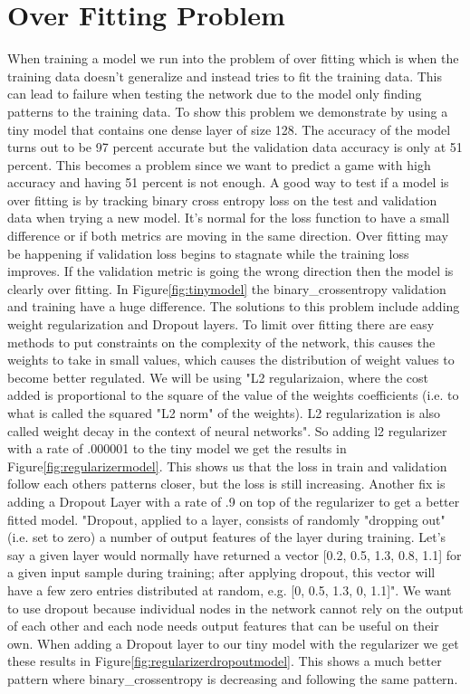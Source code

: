 \documentclass[12pt]{IEEEtran}
\begin{document}
\section{Over Fitting Problem}
When training a model we run into the problem of over fitting which is when the training data doesn't generalize and instead tries to fit the training data. This can lead to failure when testing the network due to the model only finding patterns to the training data. To show this problem we demonstrate by using a tiny model that contains one dense layer of size 128. The accuracy of the model turns out to be 97 percent accurate but the validation data accuracy is only at 51 percent. This becomes a problem since we want to predict a game with high accuracy and having 51 percent is not enough. A good way to test if a model is over fitting is by tracking binary cross entropy loss on the test and validation data when trying a new model. It's normal for the loss function to have a small difference or if both metrics are moving in the same direction. Over fitting may be happening if validation loss begins to stagnate while the training loss improves. If the validation metric is going the wrong direction then the model is clearly over fitting. In Figure\ref{fig:tinymodel} the binary\_crossentropy validation and training have a huge difference. The solutions to this problem include adding weight regularization and Dropout layers. To limit over fitting there are easy methods to put constraints on the complexity of the network, this causes the weights to take in small values, which causes the distribution of weight values to become better regulated. We will be using "L2 regularizaion, where the cost added is proportional to the square of the value of the weights coefficients (i.e. to what is called the squared "L2 norm" of the weights). L2 regularization is also called weight decay in the context of neural networks"\cite{tensorflow2015-whitepaper}. So adding l2 regularizer with a rate of .000001 to the tiny model we get the results in Figure\ref{fig:regularizermodel}. This shows us that the loss in train and validation follow each others patterns closer, but the loss is still increasing. Another fix is adding a Dropout Layer with a rate of .9 on top of the regularizer to get a better fitted model. "Dropout, applied to a layer, consists of randomly "dropping out" (i.e. set to zero) a number of output features of the layer during training. Let's say a given layer would normally have returned a vector [0.2, 0.5, 1.3, 0.8, 1.1] for a given input sample during training; after applying dropout, this vector will have a few zero entries distributed at random, e.g. [0, 0.5, 1.3, 0, 1.1]"\cite{tensorflow2015-whitepaper}. We want to use dropout because individual nodes in the network cannot rely on the output of each other and each node needs output features that can be useful on their own. When adding a Dropout layer to our tiny model with the regularizer we get these results in Figure\ref{fig:regularizerdropoutmodel}. This shows a much better pattern where binary\_crossentropy is decreasing and following the same pattern. 
\end{document}
